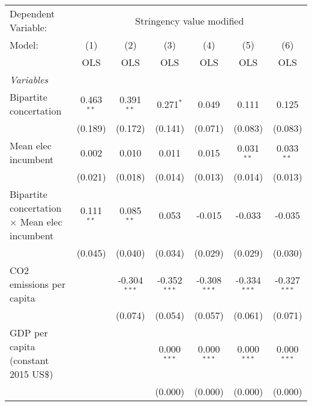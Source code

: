 
\begingroup
\centering
\begin{tabular}{lcccccc}
   \toprule
   Dependent Variable: & \multicolumn{6}{c}{Stringency value modified}\\
   Model:                                               & (1)          & (2)            & (3)            & (4)            & (5)            & (6)\\  
                                                        &  OLS         & OLS            & OLS            & OLS            & OLS            & OLS\\  
   \midrule
   \emph{Variables}\\
   Bipartite concertation                               & 0.463$^{**}$ & 0.391$^{**}$   & 0.271$^{*}$    & 0.049          & 0.111          & 0.125\\   
                                                        & (0.189)      & (0.172)        & (0.141)        & (0.071)        & (0.083)        & (0.083)\\   
   Mean elec incumbent                                  & 0.002        & 0.010          & 0.011          & 0.015          & 0.031$^{**}$   & 0.033$^{**}$\\   
                                                        & (0.021)      & (0.018)        & (0.014)        & (0.013)        & (0.014)        & (0.013)\\   
   Bipartite concertation $\times$ Mean elec incumbent  & 0.111$^{**}$ & 0.085$^{**}$   & 0.053          & -0.015         & -0.033         & -0.035\\   
                                                        & (0.045)      & (0.040)        & (0.034)        & (0.029)        & (0.029)        & (0.030)\\   
   CO2 emissions per capita                             &              & -0.304$^{***}$ & -0.352$^{***}$ & -0.308$^{***}$ & -0.334$^{***}$ & -0.327$^{***}$\\   
                                                        &              & (0.074)        & (0.054)        & (0.057)        & (0.061)        & (0.071)\\   
   GDP per capita (constant 2015 US\$)                  &              &                & 0.000$^{***}$  & 0.000$^{***}$  & 0.000$^{***}$  & 0.000$^{***}$\\   
                                                        &              &                & (0.000)        & (0.000)        & (0.000)        & (0.000)\\   

\end{tabular}
